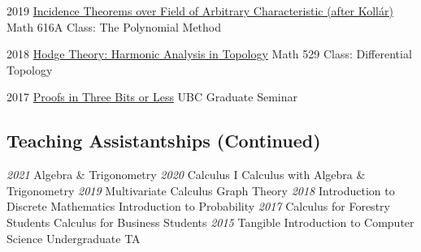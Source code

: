 \documentclass[a4paper]{cv-friggeri}
\begin{document}
\begin{entrylist}
\entry
{2019}
{\href{https://github.com/jdjake/Notes/raw/master/Talks/TalkNotes/SzemerediTrotterin3D.pdf}{Incidence Theorems over Field of Arbitrary Characteristic (after Koll\'{a}r)}}
{}
{Math 616A Class: The Polynomial Method}

\entry
{2018}
{\href{https://github.com/jdjake/Notes/raw/master/Talks/TalkNotes/HodgeTheory.pdf}{Hodge Theory: Harmonic Analysis in Topology}}
{}
{Math 529 Class: Differential Topology}



\entry
{2017}
{\href{https://github.com/jdjake/Notes/raw/master/Talks/TalkNotes/ProofsInThreeBits.pdf}{Proofs in Three Bits or Less}}
{}
{UBC Graduate Seminar}



\end{entrylist}

\begin{asidenotit}
\section{Teaching Assistantships (Continued)}
\emph{2021}
Algebra \& Trigonometry
\emph{2020}
Calculus I
Calculus with Algebra \& Trigonometry
\emph{2019}
Multivariate Calculus
Graph Theory
\emph{2018}
Introduction to Discrete Mathematics
Introduction to Probability
\emph{2017}
Calculus for Forestry Students
Calculus for Business Students
\emph{2015}
Tangible Introduction to Computer Science Undergraduate TA
\end{asidenotit}
\end{document}
